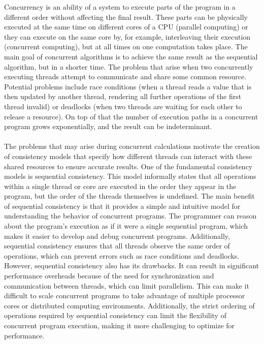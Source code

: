 \documentclass[oneside, a4paper, onecolumn, 10pt]{article}
\begin{document}
Concurrency is an ability of a system to execute parts of the program in a different order without affecting the final result. These parts can be physically executed at the same time on different cores of a CPU (parallel computing) or they can execute on the same core by, for example, interleaving their execution (concurrent computing), but at all times on one computation takes place. The main goal of concurrent algorithms is to achieve the same result as the sequential algorithm, but in a shorter time. The problem that arise when two concurrently executing threads attempt to communicate and share some common resource. Potential problems include race conditions (when a thread reads a value that is then updated by another thread, rendering all further operations of the first thread invalid) or deadlocks (when two threads are waiting for each other to release a resource). On top of that the number of execution paths in a concurrent program grows exponentially, and the result can be indeterminant.\\\\
The problems that may arise during concurrent calculations motivate the creation of consistency models that specify how different threads can interact with these shared resources to ensure accurate results. One of the fundamental consistency models is sequential consistency. This model informally states that all operations within a single thread or core are executed in the order they appear in the program, but the order of the threads themselves is undefined. The main benefit of sequential consistency is that it provides a simple and intuitive model for understanding the behavior of concurrent programs. The programmer can reason about the program's execution as if it were a single sequential program, which makes it easier to develop and debug concurrent programs. Additionally, sequential consistency ensures that all threads observe the same order of operations, which can prevent errors such as race conditions and deadlocks. However, sequential consistency also has its drawbacks. It can result in significant performance overheads because of the need for synchronization and communication between threads, which can limit parallelism. This can make it difficult to scale concurrent programs to take advantage of multiple processor cores or distributed computing environments. Additionally, the strict ordering of operations required by sequential consistency can limit the flexibility of concurrent program execution, making it more challenging to optimize for performance. \\\\
\end{document}
